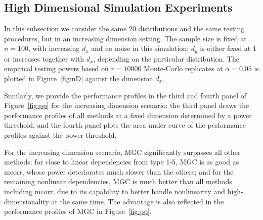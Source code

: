 \documentclass[11pt]{article}
\begin{document}
\subsection{High Dimensional Simulation Experiments}
\label{numer2}
In this subsection we consider the same $20$ distributions and the same testing procedures, but in an increasing dimension setting. The sample size is fixed at $n=100$, with increasing $d_{x}$ and no noise in this simulation; $d_{y}$ is either fixed at $1$ or increases together with $d_{x}$, depending on the particular distribution. The empirical testing powers based on $r=10000$ Monte-Carlo replicates at $\alpha=0.05$ is plotted in Figure~\ref{fig:nD} against the dimension $d_{x}$.

Similarly, we provide the performance profiles in the third and fourth panel of Figure~\ref{fig:pp} for the increasing dimension scenario: the third panel draws the performance profiles of all methods at a fixed dimension determined by a power threshold; and the fourth panel plots the area under curve of the performance profiles against the power threshold.

For the increasing dimension scenario, MGC significantly surpasses all other methods: for close to linear dependencies from type 1-5, MGC is as good as mcorr, whose power deteriorates much slower than the others; and for the remaining nonlinear dependencies, MGC is much better than all methods including mcorr, due to its capability to better handle nonlinearity and high-dimensionality at the same time. The advantage is also reflected in the performance profiles of MGC in Figure~\ref{fig:pp}. %
\end{document}
